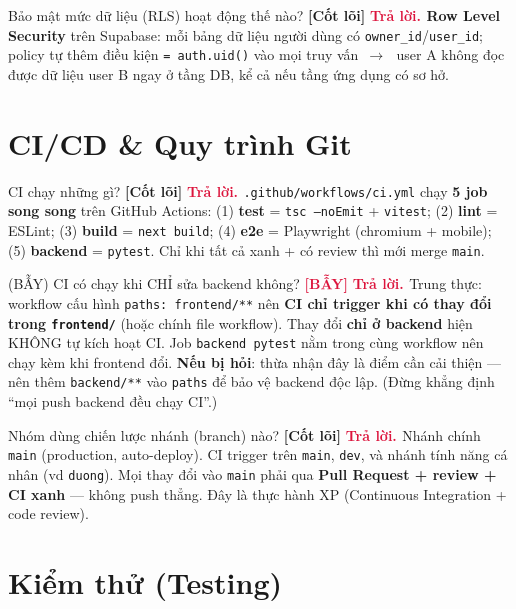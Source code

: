 \documentclass[11pt]{article}
\newcommand{\arr}{\,\ensuremath{\rightarrow}\,}
\newcommand{\code}[1]{\texttt{\small #1}}
\newcommand{\B}[1]{\textbf{#1}}
\newcommand{\tagCore}{\textcolor{steel}{\footnotesize\textbf{[Cốt lõi]}}}
\newcommand{\tagTrap}{\textcolor{crimson}{\footnotesize\textbf{[BẪY]}}}
\newcommand{\A}{\textbf{\textcolor{crimson}{Trả lời. }}}
\begin{document}
\begin{qa}{Bảo mật mức dữ liệu (RLS) hoạt động thế nào? \tagCore}
\A \B{Row Level Security} trên Supabase: mỗi bảng dữ liệu người dùng có \code{owner\_id}/\code{user\_id}; policy tự thêm điều kiện \code{= auth.uid()} vào mọi truy vấn \arr\ user A không đọc được dữ liệu user B ngay ở tầng DB, kể cả nếu tầng ứng dụng có sơ hở.
\end{qa}

\section{CI/CD \& Quy trình Git}

\begin{qa}{CI chạy những gì? \tagCore}
\A \code{.github/workflows/ci.yml} chạy \B{5 job song song} trên GitHub Actions: (1) \B{test} = \code{tsc --noEmit} + \code{vitest}; (2) \B{lint} = ESLint; (3) \B{build} = \code{next build}; (4) \B{e2e} = Playwright (chromium + mobile); (5) \B{backend} = \code{pytest}. Chỉ khi tất cả xanh + có review thì mới merge \code{main}.
\end{qa}

\begin{qa}{(BẪY) CI có chạy khi CHỈ sửa backend không? \tagTrap}
\A Trung thực: workflow cấu hình \code{paths: frontend/**} nên \B{CI chỉ trigger khi có thay đổi trong \code{frontend/}} (hoặc chính file workflow). Thay đổi \B{chỉ ở backend} hiện KHÔNG tự kích hoạt CI. Job \code{backend pytest} nằm trong cùng workflow nên chạy kèm khi frontend đổi. \B{Nếu bị hỏi}: thừa nhận đây là điểm cần cải thiện --- nên thêm \code{backend/**} vào \code{paths} để bảo vệ backend độc lập. (Đừng khẳng định ``mọi push backend đều chạy CI''.)
\end{qa}

\begin{qa}{Nhóm dùng chiến lược nhánh (branch) nào? \tagCore}
\A Nhánh chính \code{main} (production, auto-deploy). CI trigger trên \code{main}, \code{dev}, và nhánh tính năng cá nhân (vd \code{duong}). Mọi thay đổi vào \code{main} phải qua \B{Pull Request + review + CI xanh} --- không push thẳng. Đây là thực hành XP (Continuous Integration + code review).
\end{qa}

\section{Kiểm thử (Testing)}
\end{document}
